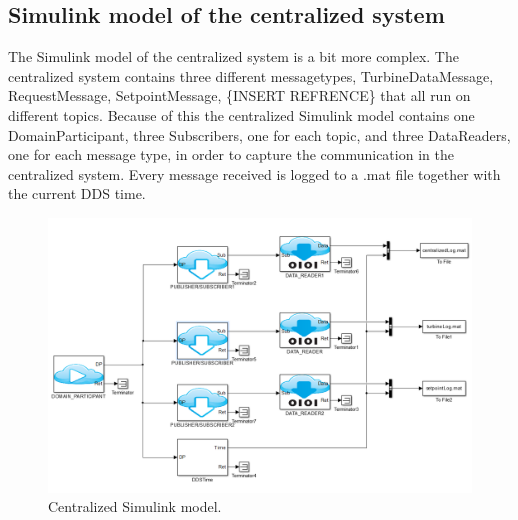 \subsection{Simulink model of the centralized system}\label{subsec:centralizedmodel}
The Simulink model of the centralized system is a bit more complex. The centralized system contains three different messagetypes, TurbineDataMessage, RequestMessage, SetpointMessage, \{INSERT REFRENCE\} that all run on different topics. Because of this the centralized Simulink model contains one DomainParticipant, three Subscribers, one for each topic, and three DataReaders, one for each message type, in order to capture the communication in the centralized system. Every message received is logged to a .mat file together with the current DDS time.

\begin{figure}[h]
\includegraphics[width=\textwidth]{figures/CentralizedModel}
	\caption[Centralized Simulink model]{
		\label{fig:centralizedSimulinkModel} 
		\footnotesize{%
			Centralized Simulink model.
		}
	}
\end{figure}